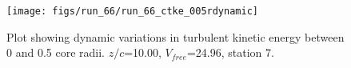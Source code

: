 \begin{figure}[H]
\centering
\texttt{[image: figs/run\_66/run\_66\_ctke\_005rdynamic]}
\caption{Plot showing dynamic variations in turbulent kinetic energy between 0 and 0.5 core radii. $z/c$=10.00, $V_{free}$=24.96, station 7.}
\label{fig:run_66_ctke_005rdynamic}
\end{figure}


